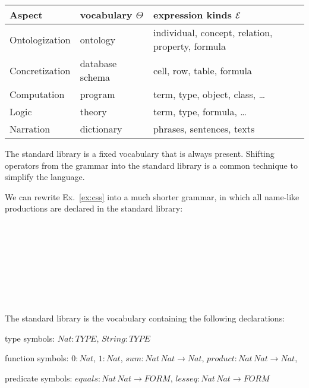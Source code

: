 \begin{center}
\begin{tabular}{l|ll}
Aspect & vocabulary $\Theta$ & expression kinds $\mathcal{E}$ \\
\hline
Ontologization  & ontology & individual, concept, relation, property, formula \\
Concretization & database schema & cell, row, table, formula \\
Computation & program & term, type, object, class, \ldots \\
Logic & theory & term, type, formula, \ldots \\
Narration & dictionary & phrases, sentences, texts \\
\end{tabular}
\end{center}

The standard library is a fixed vocabulary that is always present.
Shifting operators from the grammar into the standard library is a common technique to simplify the language.

\begin{example}\label{ex:css2}
We can rewrite Ex.~\ref{ex:css} into a much shorter grammar, in which all name-like productions are declared in the standard library:
\begin{commgrammar}
\\
\\
\\
\\
\\
\\
\\
\end{commgrammar}

The standard library is the vocabulary containing the following declarations:
\begin{compactitem}
\item type symbols: $Nat: TYPE$, $String:TYPE$
\item function symbols: $0:Nat$, $1:Nat$, $sum: Nat\,Nat\to Nat$, $product: Nat\,Nat\to Nat$,
\item predicate symbols: $equals: Nat\,Nat\to FORM$, $lesseq: Nat\,Nat\to FORM$
\end{compactitem}
\end{example}

